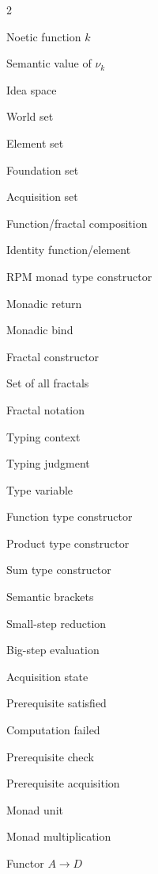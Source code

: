 \documentclass[11pt,twoside,openright]{book}
\theoremstyle{definition}
\theoremstyle{plain}
\theoremstyle{remark}
\newcommand{\sem}[1]{\llbracket #1 \rrbracket}
\newcommand{\Worlds}{\mathcal{W}}
\newcommand{\Ideas}{\mathcal{I}}
\newcommand{\Elements}{\mathcal{E}}
\newcommand{\Foundations}{\mathcal{F}}
\newcommand{\Acquisitions}{\mathcal{A}}
\newcommand{\noe}[1]{\nu_{#1}}
\newcommand{\RPM}{\mathfrak{R}}
\newcommand{\rpmret}{\mathsf{return}}
\newcommand{\rpmbind}{\mathbin{\gg\!=}}
\newcommand{\Frac}{\Phi}
\newcommand{\FracSet}{\mathbf{Frac}}
\newcommand{\id}{\mathrm{id}}
\newcommand{\smallstep}{\to}
\newcommand{\bigstep}{\Downarrow}
\newcommand{\AcqState}{\sigma}
\newcommand{\Satisfied}{\mathsf{Sat}}
\newcommand{\Failed}{\mathsf{Fail}}
\begin{document}
\begin{multicols}{2}
\begin{description}[leftmargin=2em,labelindent=0em]
\item[$\noe{k}$] Noetic function $k$
\item[$\mathfrak{n}_k$] Semantic value of $\noe{k}$
\item[$\Ideas$] Idea space
\item[$\Worlds$] World set
\item[$\Elements$] Element set
\item[$\Foundations$] Foundation set
\item[$\Acquisitions$] Acquisition set
\item[$\circ$] Function/fractal composition
\item[$\id$] Identity function/element
\item[$\RPM$] RPM monad type constructor
\item[$\rpmret$] Monadic return
\item[$\rpmbind$] Monadic bind
\item[$\Frac$] Fractal constructor
\item[$\FracSet$] Set of all fractals
\item[$\langle k_1 : \cdots : k_n \rangle$] Fractal notation
\item[$\Gamma$] Typing context
\item[$\vdash$] Typing judgment
\item[$\tau$] Type variable
\item[$\to$] Function type constructor
\item[$\times$] Product type constructor
\item[$+$] Sum type constructor
\item[$\sem{\cdot}$] Semantic brackets
\item[$\smallstep$] Small-step reduction
\item[$\bigstep$] Big-step evaluation
\item[$\AcqState$] Acquisition state
\item[$\Satisfied$] Prerequisite satisfied
\item[$\Failed$] Computation failed
\item[$\mathsf{check}$] Prerequisite check
\item[$\mathsf{acquire}$] Prerequisite acquisition
\item[$\eta$] Monad unit
\item[$\mu$] Monad multiplication
\item[$\text{ACBE}$] Functor $A \to D$

\end{description}
\end{multicols}
\end{document}
